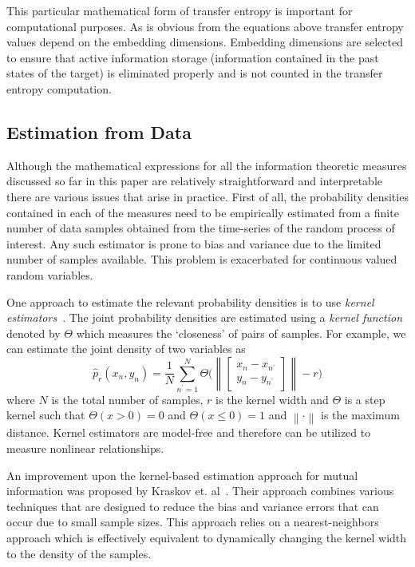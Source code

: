 \documentclass[letterpaper, 10 pt, conference]{ieeeconf}  %
\newcommand{\norm}[1]{\left\lVert#1\right\rVert}
\begin{document}
This particular mathematical form of transfer entropy is important for computational purposes. As is obvious from the equations above transfer entropy values depend on the embedding dimensions. Embedding dimensions are selected to ensure that active information storage (information contained in the past states of the target) is eliminated properly and is not counted in the transfer entropy computation. 

\subsection{Estimation from Data}

Although the mathematical expressions for all the information theoretic measures discussed so far in this paper are relatively straightforward and interpretable there are various issues that arise in practice. First of all, the probability densities contained in each of the measures need to be empirically estimated from a finite number of data samples obtained from the time-series of the random process of interest. Any such estimator is prone to bias and variance due to the limited number of samples available. This problem is exacerbated for continuous valued random variables.

One approach to estimate the relevant probability densities is to use \textit{kernel estimators}~\cite{silverman1986density}. The joint probability densities are estimated using a \textit{kernel function} denoted by $\Theta$ which measures the `closeness' of pairs of samples. For example, we can estimate the joint density of two variables as 
\begin{equation*}
\hat{p}_r(x_n, y_n) = \frac{1}{N}\sum_{n^{\prime} = 1}^{N}\Theta\Bigg(\norm{\begin{bmatrix}
	x_n - x_{n^{\prime}} \\
	y_n - y_{n^{\prime}}
	\end{bmatrix}}-r\Bigg)
\end{equation*}  
where $N$ is the total number of samples, $r$ is the kernel width and $\Theta$ is a step kernel such that $\Theta(x > 0) = 0$ and $\Theta(x \leq 0) = 1$ and $\norm{\cdot}$ is the maximum distance. Kernel estimators are model-free and therefore can be utilized to measure nonlinear relationships. 

An improvement upon the kernel-based estimation approach for mutual information was proposed by Kraskov et. al~\cite{kraskov2004estimating}. Their approach combines various techniques that are designed to reduce the bias and variance errors that can occur due to small sample sizes. This approach relies on a nearest-neighbors approach which is effectively equivalent to dynamically changing the kernel width to the density of the samples. 
\end{document}
